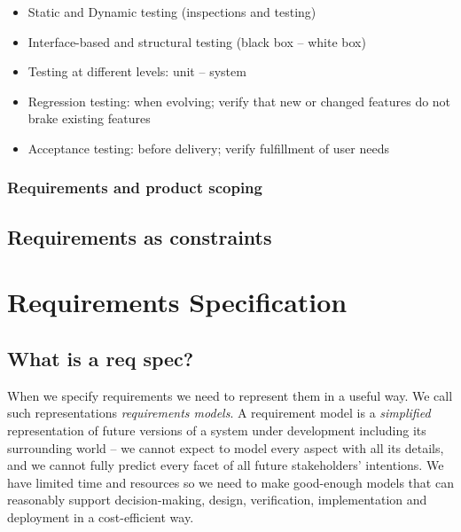 \begin{itemize}
  \item Static and Dynamic testing (inspections and testing)
  \item Interface-based and structural testing (black box -- white box)
  \item Testing at different levels: unit -- system
  \item Regression testing: when evolving; verify that new or changed features do not brake existing features
  \item Acceptance testing: before delivery; verify fulfillment of user needs
\end{itemize}


\subsubsection{Requirements and product scoping}



\subsection{Requirements as constraints}


\section{Requirements Specification}



\subsection{What is a req spec?}


When we specify requirements we need to represent them in a useful way. We call such representations \textit{requirements models}. A requirement model is a \emph{simplified} representation of future versions of a system under development including its surrounding world -- we cannot expect to model every aspect with all its details, and we cannot fully predict every facet of all future stakeholders' intentions. We have limited time and resources so we need to make good-enough models that can reasonably support decision-making, design, verification, implementation and deployment in a cost-efficient way.

